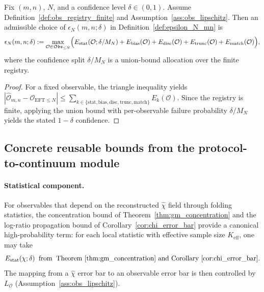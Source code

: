 \begin{theorem}\label{thm:epsilon_N_error_budget}
\MathTag Fix $(m,n)$, $N$, and a confidence level $\delta\in(0,1)$.
Assume Definition~\ref{def:obs_registry_finite} and Assumption~\ref{ass:obs_lipschitz}.
Then an admissible choice of $\epsilon_N(m,n;\delta)$ in Definition~\ref{def:epsilon_N_mn} is
\[
\epsilon_N(m,n;\delta)
:=
\max_{\mathcal{O}\in\mathfrak{Obs}_{\le N}}
\Bigl(
E_{\mathrm{stat}}(\mathcal{O};\delta/M_N)
 +E_{\mathrm{bias}}(\mathcal{O})
 +E_{\mathrm{disc}}(\mathcal{O})
 +E_{\mathrm{trunc}}(\mathcal{O})
 +E_{\mathrm{match}}(\mathcal{O})
\Bigr),
\]
where the confidence split $\delta/M_N$ is a union-bound allocation over the finite registry.
\end{theorem}
\begin{proof}
For a fixed observable, the triangle inequality yields
$
|\widehat{\mathcal{O}}_{m,n}-\mathcal{O}_{\mathrm{EFT}\le N}|
\le
\sum_{k\in\{\mathrm{stat,bias,disc,trunc,match}\}} E_k(\mathcal{O}).
$
Since the registry is finite, applying the union bound with per-observable failure probability $\delta/M_N$ yields the stated $1-\delta$ confidence.
\end{proof}

\subsection{Concrete reusable bounds from the protocol-to-continuum module}

\paragraph{Statistical component.}
For observables that depend on the reconstructed $\widehat\chi$ field through folding statistics, the concentration bound of Theorem~\ref{thm:gm_concentration} and the log-ratio propagation bound of Corollary~\ref{cor:chi_error_bar} provide a canonical high-probability term:
for each local statistic with effective sample size $K_{\mathrm{eff}}$, one may take
\[
E_{\mathrm{stat}}(\chi;\delta)
\;\;\text{from}\;\;
\text{Theorem~\ref{thm:gm_concentration} and Corollary~\ref{cor:chi_error_bar}}.
\]
The mapping from a $\widehat\chi$ error bar to an observable error bar is then controlled by $L_{\mathcal{O}}$ (Assumption~\ref{ass:obs_lipschitz}).

